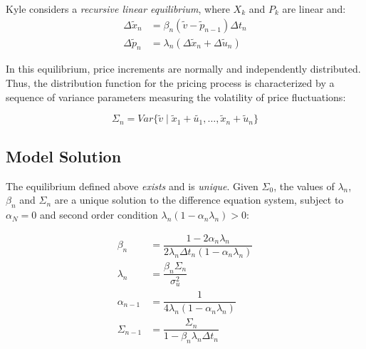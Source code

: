 \documentclass{beamer}
\begin{document}
\begin{frame}
    Kyle considers a \textit{recursive linear equilibrium}, where $X_k$ and $P_k$ are linear and:
    \begin{align}
        \Delta \tilde{x}_n &= \beta_n(\tilde{v} - \tilde{p}_{n-1}) \Delta t_n \\
        \Delta \tilde{p}_n &= \lambda_n(\Delta \tilde{x}_n + \Delta \tilde{u}_n)
    \end{align}

    In this equilibrium, price increments are normally and independently distributed. Thus, the distribution function for the pricing process is characterized by a sequence of variance parameters measuring the volatility of price fluctuations:

        \begin{equation}
            \Sigma_n = Var \{\tilde{v} \mid \tilde{x}_1 + \tilde{u_1}, \ldots, \tilde{x}_n + \tilde{u}_n \}
        \end{equation}

\end{frame}

\subsection{Model Solution}

\begin{frame}
    The equilibrium defined above \textit{exists} and is \textit{unique}. Given $\Sigma_0$, the values of $\lambda_n$, $\beta_n$ and $\Sigma_n$ are a unique solution to the difference equation system, subject to $\alpha_N = 0$ and second order condition $\lambda_n (1 - \alpha_n\lambda_n) > 0$:

    \begin{align}
        \beta_n &= \dfrac{1 - 2\alpha_n\lambda_n}{2\lambda_n\Delta t_n (1 - \alpha_n\lambda_n)} \\
        \lambda_n &= \dfrac{\beta_n\Sigma_n}{\sigma_u^2} \\
        \alpha_{n-1} &= \dfrac{1}{4\lambda_{n}(1 - \alpha_{n}\lambda_{n})} \\
        \Sigma_{n-1} &= \dfrac{\Sigma_{n}}{1 - \beta_{n}\lambda_{n}\Delta t_{n}}
    \end{align}
\end{frame}
\end{document}
